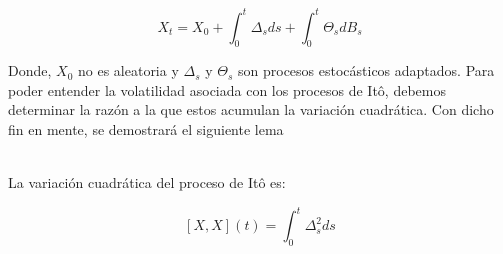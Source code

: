 \documentclass[11pt,notitlepage]{article}
\begin{document}
\begin{equation}\label{secc2.3_ProcesosdeIto}
    X_{t}=X_{0}+\int_{0}^{t}\Delta_{s}ds + \int_{0}^{t}\Theta_{s}dB_{s}
\end{equation}

Donde, $X_{0}$ no es aleatoria y $\Delta_{s}$ y $\Theta_{s}$ son procesos estocásticos adaptados. Para poder entender la volatilidad asociada con los procesos de Itô, debemos determinar la razón a la que estos acumulan la variación cuadrática. Con dicho fin en mente, se demostrará el siguiente lema\\ \\

\begin{lema}\label{secc2.3_lema1}
La variación cuadrática del proceso de Itô es:

\begin{equation}\label{secc2.3_variación-cuadrática-Ito}
    \left [ X,X \right ](t)=\int_{0}^{t}\Delta^{2}_{s} ds
\end{equation}
\end{lema} 
\end{document}
